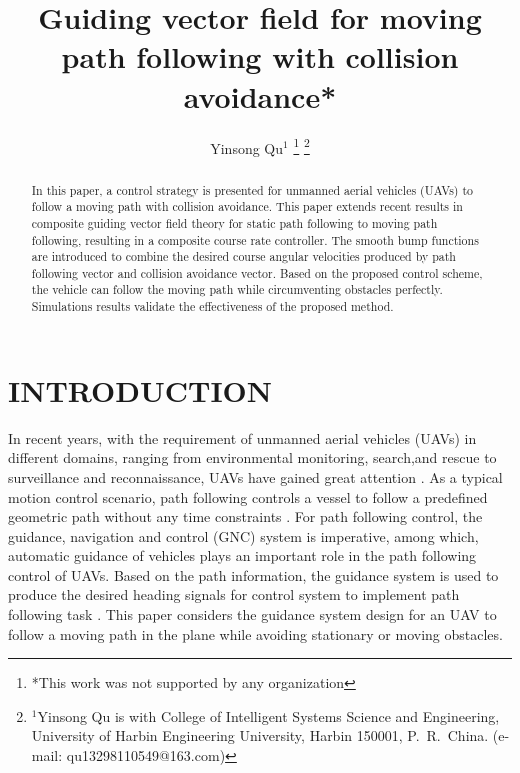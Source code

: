 \documentclass[a4paper, 10pt, conference]{ieeeconf}      %
\title{\LARGE \bf
Guiding vector field for moving path following with collision avoidance*
}
\author{Yinsong Qu$^{1}$   %
\thanks{*This work was not supported by any organization}%
\thanks{$^{1}$Yinsong Qu is with College of Intelligent Systems Science and Engineering, 
	University of Harbin Engineering University, Harbin 150001, P.~R.~China.
    (e-mail: qu13298110549@163.com)}%
}
\begin{document}
\maketitle
\thispagestyle{empty}
\pagestyle{empty}


\begin{abstract}

In this paper, a control strategy is presented for unmanned aerial vehicles (UAVs) to follow a moving path with collision avoidance. This paper extends recent results in composite guiding vector field theory for static path following to moving path following, resulting in a composite course rate controller.  The smooth bump functions are introduced to combine the desired course angular velocities produced by path following vector and collision avoidance vector. Based on the proposed control scheme, the vehicle can follow the moving path while circumventing obstacles perfectly. Simulations results validate the effectiveness of the proposed method.

\end{abstract}
\section{INTRODUCTION}

In recent years, with the requirement of unmanned aerial vehicles (UAVs) in different domains, ranging from environmental monitoring, search,and rescue to surveillance and reconnaissance, UAVs have gained great attention \cite{c1}. As a typical motion control scenario, path following controls a vessel to follow a predefined geometric path without any time constraints \cite{c2}. For path following control, the guidance, navigation and control (GNC) system is imperative, among which, automatic guidance of vehicles plays an important role in the path following control of UAVs. Based on the path information, the guidance system is used to produce the desired heading signals for control system to implement path following task \cite{c3}. This paper considers the guidance system design for an UAV to follow a moving path in the plane while avoiding stationary or moving obstacles.
\end{document}

